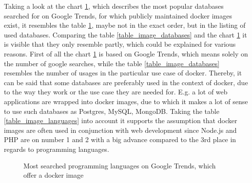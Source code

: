 Taking a look at the chart \ref{fig:databases_top_ranking}, which describes the most popular databases searched for on Google Trends, for which publicly maintained docker images exist, it resembles the table \ref{fig:databases_top_ranking}, maybe not in the exact order, but in the listing of used databases.
Comparing the table \ref{table_image_databases} and the chart \ref{fig:databases_top_ranking} it is visible that they only resemble partly, which could be explained for various reasons. First of all the chart \ref{fig:databases_top_ranking} is based on Google Trends, which means solely on the number of google searches, while the table \ref{table_image_databases} resembles the number of usages in the particular use case of docker. Thereby, it can be said that some databases are preferably used in the context of docker, due to the way they work or the use case they are needed for. E.g. a lot of web applications are wrapped into docker images, due to which it makes a lot of sense to use such databases as Postgres, MySQL, MongoDB. Taking the table \ref{table_image_languages} into account it supports the assumption that docker images are often used in conjunction with web development since Node.js and PHP are on number 1 and 2 with a big advance compared to the 3rd place in regards to programming languages.

\begin{figure}[H]
    \centering
    \def\stackalignment{r}
    \caption{Most searched programming languages on Google Trends, which offer a docker image}
    \label{fig:databases_top_ranking}
\end{figure}

